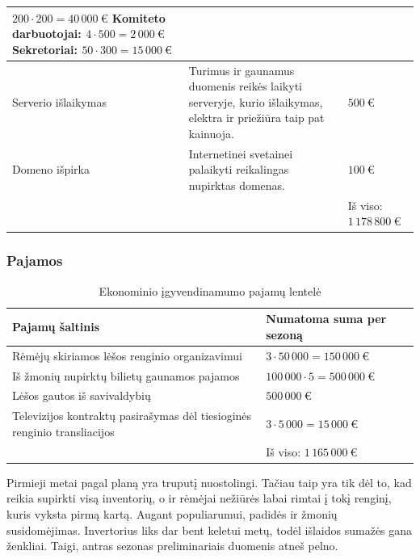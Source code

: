 \documentclass{VUMIFPSkursinis}
\begin{document}
\begin{table}[H]
\begin{tabularx} {.9\textwidth}{ | m{2cm} | m{7cm} | X |}
					$200 \cdot  200 = 40\,000\ €$\newline
					Komiteto darbuotojai:\newline
					$4 \cdot  500 = 2\,000\ €$\newline
					Sekretoriai:\newline
					$50 \cdot  300 = 15\,000\ € $\\
				\hline
					Serverio išlaikymas & Turimus ir gaunamus duomenis reikės laikyti serveryje, kurio išlaikymas, elektra ir priežiūra taip pat kainuoja. & $500\ €$ \\
				\hline
					Domeno išpirka & Internetinei svetainei palaikyti reikalingas nupirktas domenas. & $100\ €$ \\
				\hline
					\multicolumn{2}{c|}{} & Iš viso: $1\,178\,800\ €$ \\
				\cline{3-3}
			\end{tabularx}
		\end{table}
	\subsubsection*{Pajamos}
		\begin{table}[H]
			\caption{Ekonominio įgyvendinamumo pajamų lentelė}
			\label{table:ekonominisIgyvendinamumas_pajamos}
			\begin{tabularx} {.9\textwidth}{ | X | X |}
				\hline
					\textbf{Pajamų šaltinis} & \textbf{Numatoma suma per sezoną} \\
				\hline
					Rėmėjų skiriamos lėšos renginio organizavimui & $3 \cdot 50\,000 = 150\,000\ €$ \\
				\hline
					Iš žmonių nupirktų bilietų gaunamos pajamos & $100\,000 \cdot 5 = 500\,000\ €$ \\
				\hline
					Lėšos gautos iš savivaldybių & $500\,000\ €$ \\
				\hline
					Televizijos kontraktų pasirašymas dėl tiesioginės renginio transliacijos & $3 \cdot 5\,000 = 15\,000\ €$ \\
				\hline
					\multicolumn{1}{c|}{} &  Iš viso: $1\,165\,000\ €$ \\
				\cline{2-2}
			\end{tabularx}
		\end{table}
		Pirmieji metai pagal planą yra truputį nuostolingi. Tačiau taip yra tik dėl to, kad reikia supirkti visą inventorių, o ir rėmėjai nežiūrės labai rimtai į tokį renginį, kuris vyksta pirmą kartą. Augant populiarumui, padidės ir žmonių susidomėjimas. Invertorius liks dar bent keletui metų, todėl išlaidos sumažės gana ženkliai. Taigi, antras sezonas preliminariais duomenis atneš pelno.
\end{document}
